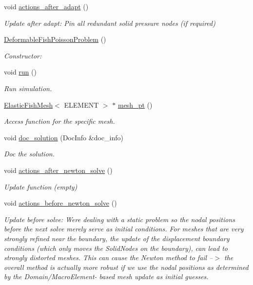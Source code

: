 \begin{DoxyCompactItemize}
void \hyperlink{classDeformableFishPoissonProblem_ada340a31a3b019116ecb7c0bb1d4c779}{actions\+\_\+after\+\_\+adapt} ()
\begin{DoxyCompactList}\small\item\em Update after adapt\+: Pin all redundant solid pressure nodes (if required) \end{DoxyCompactList}\item 
\hyperlink{classDeformableFishPoissonProblem_a383952a668f3cec16b85c6b35f437ddd}{Deformable\+Fish\+Poisson\+Problem} ()
\begin{DoxyCompactList}\small\item\em Constructor\+: \end{DoxyCompactList}\item 
void \hyperlink{classDeformableFishPoissonProblem_a0ef0e4ab464ab41a6f0b7e8a74a9c8a5}{run} ()
\begin{DoxyCompactList}\small\item\em Run simulation. \end{DoxyCompactList}\item 
\hyperlink{classElasticFishMesh}{Elastic\+Fish\+Mesh}$<$ E\+L\+E\+M\+E\+NT $>$ $\ast$ \hyperlink{classDeformableFishPoissonProblem_a5d392625fca2a9d2848205d1e0d016a8}{mesh\+\_\+pt} ()
\begin{DoxyCompactList}\small\item\em Access function for the specific mesh. \end{DoxyCompactList}\item 
void \hyperlink{classDeformableFishPoissonProblem_aee9b59f35d1ae98cda29fba0c01b226a}{doc\+\_\+solution} (Doc\+Info \&doc\+\_\+info)
\begin{DoxyCompactList}\small\item\em Doc the solution. \end{DoxyCompactList}\item 
void \hyperlink{classDeformableFishPoissonProblem_a18fdfaadd9ae10257088b9533f139182}{actions\+\_\+after\+\_\+newton\+\_\+solve} ()
\begin{DoxyCompactList}\small\item\em Update function (empty) \end{DoxyCompactList}\item 
void \hyperlink{classDeformableFishPoissonProblem_ad9d03c8349a059430f7329354033b450}{actions\+\_\+before\+\_\+newton\+\_\+solve} ()
\begin{DoxyCompactList}\small\item\em Update before solve\+: We\textquotesingle{}re dealing with a static problem so the nodal positions before the next solve merely serve as initial conditions. For meshes that are very strongly refined near the boundary, the update of the displacement boundary conditions (which only moves the Solid\+Nodes {\itshape on} the boundary), can lead to strongly distorted meshes. This can cause the Newton method to fail --$>$ the overall method is actually more robust if we use the nodal positions as determined by the Domain/\+Macro\+Element-\/ based mesh update as initial guesses. \end{DoxyCompactList}\item 

\end{DoxyCompactItemize}
